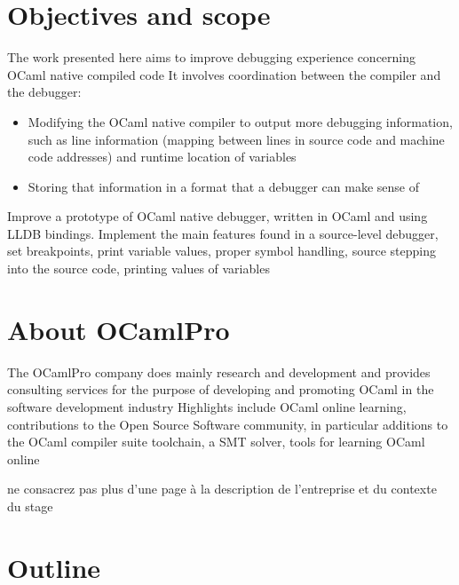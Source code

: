 \section{Objectives and scope\label{sec:objective}}

The work presented here aims to improve debugging experience concerning OCaml native compiled code
It involves coordination between the compiler and the debugger:

\begin{itemize}
    \item Modifying the OCaml native compiler to output more debugging information, such as line information (mapping between lines in source code and machine code addresses) and runtime location of variables
    \item Storing that information in a format that a debugger can make sense of
\end{itemize}

Improve a prototype of OCaml native debugger, written in OCaml and using LLDB bindings.
Implement the main features found in a source-level debugger,
set breakpoints, print variable values, proper symbol handling, source stepping into the source code, printing values of variables

\section{About OCamlPro\label{sec:scope}}

The OCamlPro company does mainly research and development and provides consulting services for the purpose of developing and promoting OCaml in the software development industry
Highlights include OCaml online learning, contributions to the Open Source Software community, in particular additions to
the OCaml compiler suite toolchain, a SMT solver, tools for learning OCaml online

ne consacrez pas plus d’une page
à la description de l’entreprise et du contexte du stage


\section{Outline\label{sec:outline}}

